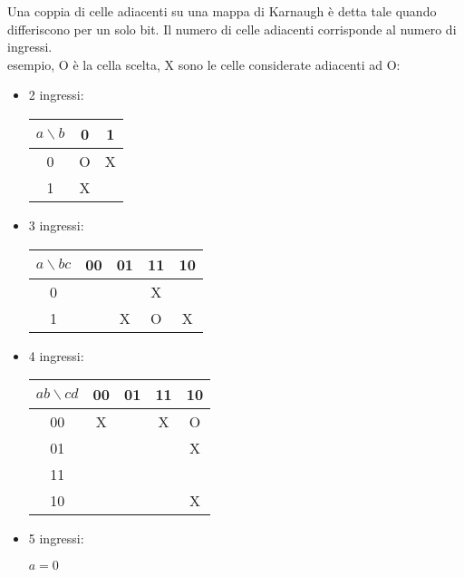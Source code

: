 \documentclass{subfiles}
\begin{document}
Una coppia di celle adiacenti su una mappa di Karnaugh è detta tale quando differiscono per un solo bit.
Il numero di celle adiacenti corrisponde al numero di ingressi.\\

\noindent
esempio, O è la cella scelta, X sono le celle considerate adiacenti ad O:

\begin{itemize}
    \item 2 ingressi:

    \begin{center}
    \begin{tabular}{ |c|c|c| }
    \hline
    $a \backslash b$ & 0 & 1 \\
    \hline
    \hline
    0 & O & X \\
    1 & X & \\
    \hline
    \end{tabular}
    \end{center}

    \item 3 ingressi:

    \begin{center}
    \begin{tabular}{ |c|c|c|c|c| }
    \hline
    $a \backslash bc$ & 00 & 01 & 11 & 10 \\
    \hline
    \hline
    0 & & & X & \\
    1 & & X & O & X \\
    \hline
    \end{tabular}
    \end{center}

    \item 4 ingressi:

    \begin{center}
    \begin{tabular}{ |c|c|c|c|c| }
    \hline
    $ab \backslash cd$ & 00 & 01 & 11 & 10 \\
    \hline
    \hline
    00 & X & & X & O \\
    01 & & & & X \\
    11 & & & & \\
    10 & & & & X \\
    \hline
    \end{tabular}
    \end{center}

    \item 5 ingressi:

    $a=0$


\end{itemize}
\end{document}
